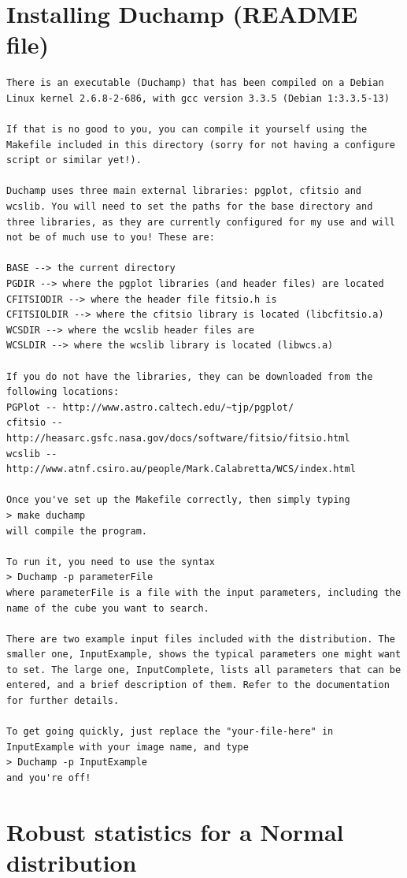 \documentclass[12pt,a4paper]{article}
\begin{document}
\section{Installing Duchamp (README file)}
\begin{verbatim}
There is an executable (Duchamp) that has been compiled on a Debian
Linux kernel 2.6.8-2-686, with gcc version 3.3.5 (Debian 1:3.3.5-13)

If that is no good to you, you can compile it yourself using the
Makefile included in this directory (sorry for not having a configure
script or similar yet!).

Duchamp uses three main external libraries: pgplot, cfitsio and
wcslib. You will need to set the paths for the base directory and
three libraries, as they are currently configured for my use and will
not be of much use to you! These are:

BASE --> the current directory
PGDIR --> where the pgplot libraries (and header files) are located
CFITSIODIR --> where the header file fitsio.h is
CFITSIOLDIR --> where the cfitsio library is located (libcfitsio.a)
WCSDIR --> where the wcslib header files are
WCSLDIR --> where the wcslib library is located (libwcs.a)

If you do not have the libraries, they can be downloaded from the
following locations: 
PGPlot -- http://www.astro.caltech.edu/~tjp/pgplot/
cfitsio -- http://heasarc.gsfc.nasa.gov/docs/software/fitsio/fitsio.html
wcslib -- http://www.atnf.csiro.au/people/Mark.Calabretta/WCS/index.html

Once you've set up the Makefile correctly, then simply typing
> make duchamp
will compile the program.

To run it, you need to use the syntax
> Duchamp -p parameterFile
where parameterFile is a file with the input parameters, including the
name of the cube you want to search.

There are two example input files included with the distribution. The
smaller one, InputExample, shows the typical parameters one might want
to set. The large one, InputComplete, lists all parameters that can be
entered, and a brief description of them. Refer to the documentation
for further details.

To get going quickly, just replace the "your-file-here" in
InputExample with your image name, and type
> Duchamp -p InputExample
and you're off!
\end{verbatim}

\section{Robust statistics for a Normal distribution}
\label{app-madfm}
\end{document}
